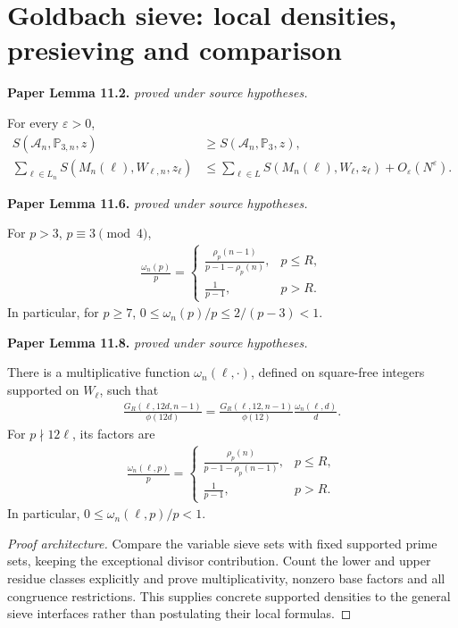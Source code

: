 \section{Goldbach sieve: local densities, presieving and comparison}

\begin{lemma}
\label{sieve_local_data}
\leanok
\par\medskip\noindent\textbf{Paper Lemma 11.2.} \textit{proved under source hypotheses.}\par
For every \(\varepsilon>0\),
\begin{align}
 S(\mathcal A_n,\mathbb P_{3,n},z)
 &\geq S(\mathcal A_n,\mathbb P_3,z),
 \\
 \sum_{\ell\in L_n}S(M_n(\ell),W_{\ell,n},z_\ell)
 &\leq
 \sum_{\ell\in L}S(M_n(\ell),W_\ell,z_\ell)
 +O_\varepsilon(N^\varepsilon).
\end{align}
\par\medskip\noindent\textbf{Paper Lemma 11.6.} \textit{proved under source hypotheses.}\par
For \(p>3\), \(p\equiv3\pmod4\),
\begin{align}
 \frac{\omega_n(p)}p
 =
 \begin{cases}
 \displaystyle
 \frac{\rho_p(n-1)}{p-1-\rho_p(n)},&p\leq R,\\[7pt]
 \displaystyle\frac1{p-1},&p>R.
 \end{cases}
\end{align}
In particular, for \(p\geq7\),
\(0\leq\omega_n(p)/p\leq2/(p-3)<1\).
\par\medskip\noindent\textbf{Paper Lemma 11.8.} \textit{proved under source hypotheses.}\par
There is a multiplicative function
\(\omega_n(\ell,\cdot)\), defined on square-free integers supported on
\(W_\ell\), such that
\begin{align}
 \frac{G_R(\ell,12d,n-1)}{\phi(12d)}
 =
 \frac{G_R(\ell,12,n-1)}{\phi(12)}
 \frac{\omega_n(\ell,d)}d .
\end{align}
For \(p\nmid12\ell\), its  factors are
\begin{align}
 \frac{\omega_n(\ell,p)}p
 =
 \begin{cases}
 \displaystyle
 \frac{\rho_p(n)}{p-1-\rho_p(n-1)},&p\leq R,\\[7pt]
 \displaystyle\frac1{p-1},&p>R.
 \end{cases}
\end{align}
In particular, \(0\leq\omega_n(\ell,p)/p<1\).
\end{lemma}
\begin{proof}[Proof architecture]
\leanok
Compare the variable sieve sets with fixed supported prime sets, keeping the exceptional divisor contribution. Count the lower and upper residue classes explicitly and prove multiplicativity, nonzero base factors and all congruence restrictions. This supplies concrete supported densities to the general sieve interfaces rather than postulating their local formulas.
\end{proof}

